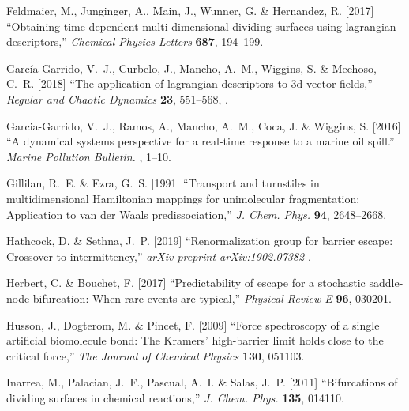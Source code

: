 \documentclass{ws-ijbc}
\begin{document}
\begin{thebibliography}{76}
	Feldmaier, M., Junginger, A., Main, J., Wunner, G. \& Hernandez, R. [2017]
	\enquote{Obtaining time-dependent multi-dimensional dividing surfaces using
		lagrangian descriptors,} \emph{Chemical Physics Letters} \textbf{687},
	194--199.
	
	Garc{\'i}a-Garrido, V.~J., Curbelo, J., Mancho, A.~M., Wiggins, S. \& Mechoso,
	C.~R. [2018] \enquote{The application of lagrangian descriptors to 3d vector
		fields,} \emph{Regular and Chaotic Dynamics} \textbf{23},  551--568,
	.
	
	Garcia-Garrido, V.~J., Ramos, A., Mancho, A.~M., Coca, J. \& Wiggins, S. [2016]
	\enquote{{A dynamical systems perspective for a real-time response to a
			marine oil spill.}} \emph{Marine Pollution Bulletin.} ,
	1--10.
	
	Gillilan, R.~E. \& Ezra, G.~S. [1991] \enquote{{Transport and turnstiles in
			multidimensional Hamiltonian mappings for unimolecular fragmentation:
			Application to van der Waals predissociation},} \emph{J. Chem. Phys.}
	\textbf{94},  2648--2668.
	
	Hathcock, D. \& Sethna, J.~P. [2019] \enquote{Renormalization group for barrier
		escape: Crossover to intermittency,} \emph{arXiv preprint arXiv:1902.07382} .
	
	Herbert, C. \& Bouchet, F. [2017] \enquote{Predictability of escape for a
		stochastic saddle-node bifurcation: {When} rare events are typical,}
	\emph{Physical Review E} \textbf{96},  030201.
	
	Husson, J., Dogterom, M. \& Pincet, F. [2009] \enquote{Force spectroscopy of a
		single artificial biomolecule bond: {The} {Kramers}’ high-barrier limit
		holds close to the critical force,} \emph{The Journal of Chemical Physics}
	\textbf{130},  051103.
	
	Inarrea, M., Palacian, J.~F., Pascual, A.~I. \& Salas, J.~P. [2011]
	\enquote{Bifurcations of dividing surfaces in chemical reactions,} \emph{J.
		Chem. Phys.} \textbf{135},  014110.
	

\end{thebibliography}
\end{document}
